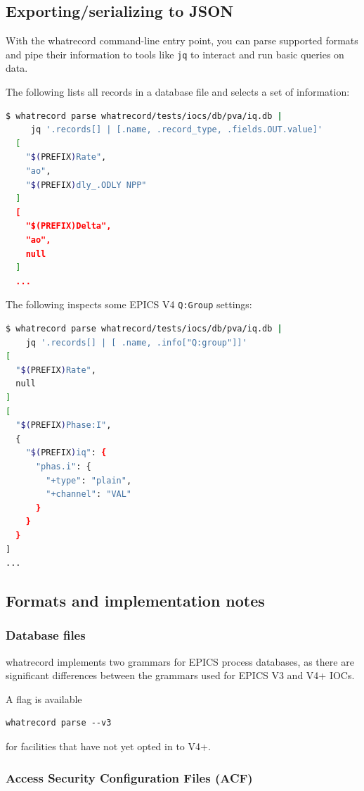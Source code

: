 \documentclass[letter,
               keeplastbox,   %
               ]{jacow}
\begin{document}
\subsection{Exporting/serializing to JSON}

With the whatrecord command-line entry point, you can parse supported formats
and pipe their information to tools like \verb_jq_\cite{jq} to interact and run
basic queries on data.

The following lists all records in a database file and selects a set of
information:
\begin{lstlisting}[language=bash]
  $ whatrecord parse whatrecord/tests/iocs/db/pva/iq.db |
     jq '.records[] | [.name, .record_type, .fields.OUT.value]'
  [
    "$(PREFIX)Rate",
    "ao",
    "$(PREFIX)dly_.ODLY NPP"
  ]
  [
    "$(PREFIX)Delta",
    "ao",
    null
  ]
  ...
\end{lstlisting}

The following inspects some EPICS V4 \verb_Q:Group_ settings:

\begin{lstlisting}[language=bash]
$ whatrecord parse whatrecord/tests/iocs/db/pva/iq.db | 
    jq '.records[] | [ .name, .info["Q:group"]]'
[
  "$(PREFIX)Rate",
  null
]
[
  "$(PREFIX)Phase:I",
  {
    "$(PREFIX)iq": {
      "phas.i": {
        "+type": "plain",
        "+channel": "VAL"
      }
    }
  }
]
...

\end{lstlisting}

\subsection{Formats and implementation notes}

\subsubsection{Database files}

whatrecord implements two grammars for EPICS process databases, as there are
significant differences between the grammars used for EPICS V3 and V4+ IOCs.

A flag is available \begin{verbatim}whatrecord parse --v3\end{verbatim} for
facilities that have not yet opted in to V4+.

\subsubsection{Access Security Configuration Files (ACF)}
\end{document}
